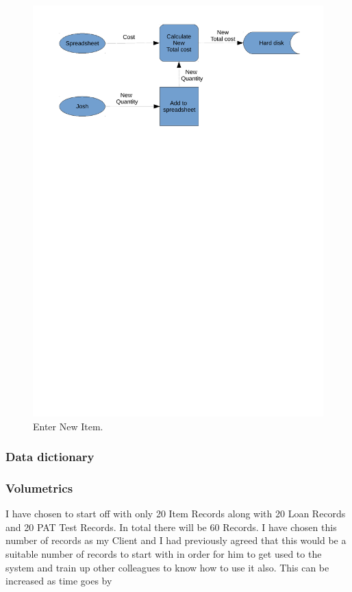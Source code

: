 \documentclass[a4paper,12pt]{report}
\begin{document}
\begin{figure}[H]
    \caption{Enter New Item.} \label{fig:print_function_result}
    \includegraphics[width=\textwidth]{./Dataflow/Data_flow_update.pdf}
\end{figure}

\subsubsection{Data dictionary}

\subsubsection{Volumetrics}

I have chosen to start off with only 20 Item Records along with 20 Loan Records and 20 PAT Test Records. In total there will be 60 Records.  I have chosen this number of records as my Client and I had previously agreed that this would be a suitable number of records to start with in order for him to get used to the system and train up other colleagues to know how to use it also. This can be increased as time goes by
\end{document}
